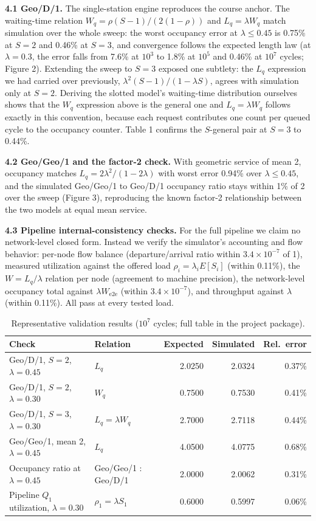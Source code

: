 \documentclass[11pt,a4paper]{article}
\begin{document}
\textbf{4.1 Geo/D/1.} The single-station engine reproduces the course anchor.
The waiting-time relation $W_q = \rho(S-1)/(2(1-\rho))$ and $L_q = \lambda W_q$
match simulation over the whole sweep: the worst occupancy error at
$\lambda \le 0.45$ is 0.75\% at $S=2$ and 0.46\% at $S=3$, and convergence
follows the expected length law (at $\lambda = 0.3$, the error falls from
7.6\% at $10^3$ to 1.8\% at $10^5$ and 0.46\% at $10^7$ cycles; Figure 2).
Extending the sweep to $S=3$ exposed one subtlety: the $L_q$ expression we had
carried over previously, $\lambda^2(S-1)/(1-\lambda S)$, agrees with simulation
only at $S=2$. Deriving the slotted model's waiting-time distribution
ourselves shows that the $W_q$ expression above is the general one and
$L_q = \lambda W_q$ follows exactly in this convention, because each request
contributes one count per queued cycle to the occupancy counter. Table 1
confirms the $S$-general pair at $S=3$ to 0.44\%.

\textbf{4.2 Geo/Geo/1 and the factor-2 check.} With geometric service of mean
2, occupancy matches $L_q = 2\lambda^2/(1-2\lambda)$ with worst error 0.94\%
over $\lambda \le 0.45$, and the simulated Geo/Geo/1 to Geo/D/1 occupancy
ratio stays within 1\% of 2 over the sweep (Figure 3), reproducing the known
factor-2 relationship between the two models at equal mean service.

\textbf{4.3 Pipeline internal-consistency checks.} For the full pipeline we
claim no network-level closed form. Instead we verify the simulator's
accounting and flow behavior: per-node flow balance (departure/arrival ratio
within $3.4\times10^{-7}$ of 1), measured utilization against the offered load
$\rho_i = \lambda_i E[S_i]$ (within 0.11\%), the $W = L_q/\lambda$ relation per
node (agreement to machine precision), the network-level occupancy total
against $\lambda W_{\text{e2e}}$ (within $3.4\times10^{-7}$), and throughput
against $\lambda$ (within 0.11\%). All pass at every tested load.

\begin{table}[H]
\centering\small
\caption{Representative validation results ($10^7$ cycles; full table in the
project package).}
\begin{tabular}{@{}llrrr@{}}
\toprule
Check & Relation & Expected & Simulated & Rel.\ error \\
\midrule
Geo/D/1, $S{=}2$, $\lambda{=}0.45$ & $L_q$ & 2.0250 & 2.0324 & 0.37\% \\
Geo/D/1, $S{=}2$, $\lambda{=}0.30$ & $W_q$ & 0.7500 & 0.7530 & 0.41\% \\
Geo/D/1, $S{=}3$, $\lambda{=}0.30$ & $L_q=\lambda W_q$ & 2.7000 & 2.7118 & 0.44\% \\
Geo/Geo/1, mean 2, $\lambda{=}0.45$ & $L_q$ & 4.0500 & 4.0775 & 0.68\% \\
Occupancy ratio at $\lambda{=}0.45$ & Geo/Geo/1 $:$ Geo/D/1 & 2.0000 & 2.0062 & 0.31\% \\
Pipeline $Q_1$ utilization, $\lambda{=}0.30$ & $\rho_1=\lambda S_1$ & 0.6000 & 0.5997 & 0.06\% \\
\bottomrule
\end{tabular}
\end{table}
\end{document}
